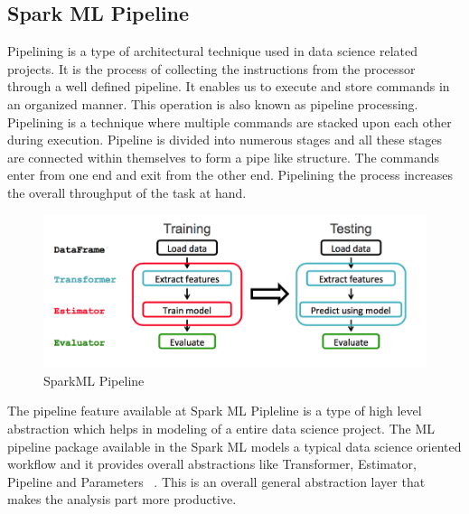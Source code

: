 \subsection{Spark ML Pipeline}
Pipelining is a type of architectural technique used in data science related 
projects. It is the process of collecting the instructions from the processor 
through a well defined pipeline. It enables us to execute and store 
commands in an organized manner. This operation is also known as pipeline 
processing. Pipelining is a technique where multiple commands are 
stacked upon each other during execution. Pipeline is divided into numerous 
stages and all these stages are connected within themselves to form a pipe 
like structure. The commands enter from one end and exit from the other end. 
Pipelining the process increases the overall throughput of the task at hand.

\begin{figure}[!ht]
\centering\includegraphics[width=\columnwidth]{images/spark_pipeline.png}
\caption{SparkML Pipeline~\cite{hid-sp18-418-spark-pipeline}}
\label{f:Pipeline in SparkML}
\end{figure}

The pipeline feature available at Spark ML Pipleline is a type of high 
level abstraction which helps in modeling of a entire data science project.
 The ML pipeline package available in the Spark ML models a typical 
 data science oriented workflow and it provides overall abstractions 
 like Transformer, Estimator, Pipeline and Parameters ~\cite{hid-sp18-418-spark}. 
 This is an overall general abstraction layer that makes the analysis 
 part more productive.

